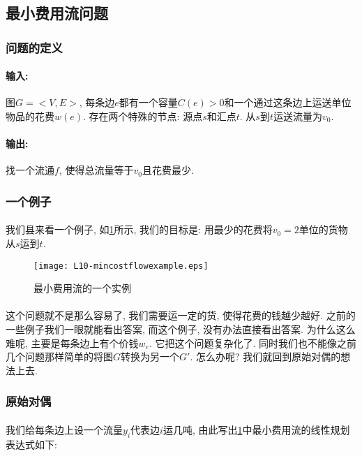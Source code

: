         
    
    \subsection{最小费用流问题}
        \subsubsection*{问题的定义}
        \paragraph{输入:} 图$G=<V, E>$, 每条边$e$都有一个容量$C(e) > 0$和一个通过这条边上运送单位物品的{花费$w(e)$}. 存在两个特殊的节点: 源点$s$和汇点$t$. 从$s$到$t$运送流量为$v_0$.
        \paragraph{输出:}找一个流通$f$, 使得总流量等于$v_0$且花费最少.
        \subsubsection*{一个例子}
        \paragraph{}我们县来看一个例子, 如\figurename\ref{Figure: min_cost_flow_example}所示, 我们的目标是: 用最少的花费将$v_{0}=2$单位的货物从$s$运到$t$. 
        \begin{figure}[h]
            \centering
            \texttt{[image: L10-mincostflowexample.eps]}
            \caption{最小费用流的一个实例}
            \label{Figure: min_cost_flow_example}
        \end{figure}
        \paragraph{}这个问题就不是那么容易了, 我们需要运一定的货, 使得花费的钱越少越好. 之前的一些例子我们一眼就能看出答案, 而这个例子, 没有办法直接看出答案. 为什么这么难呢, 主要是每条边上有个价钱$w_{e}$. 它把这个问题复杂化了. 同时我们也不能像之前几个问题那样简单的将图$G$转换为另一个$G'$. 怎么办呢? 我们就回到原始对偶的想法上去.
        \subsubsection*{原始对偶}
        \paragraph{}我们给每条边上设一个流量$y_{i}$代表边$i$运几吨, 由此写出\figurename\ref{Figure: min_cost_flow_example}中最小费用流的线性规划表达式如下:

